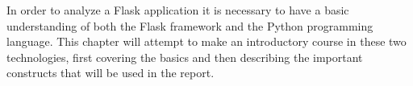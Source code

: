 In order to analyze a Flask application it is necessary to have a basic understanding of both the Flask framework and the Python programming language.
This chapter will attempt to make an introductory course in these two technologies, first covering the basics and then describing the important constructs that will be used in the report.
